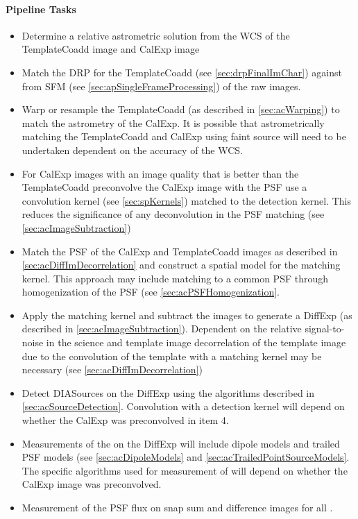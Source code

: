\paragraph{Pipeline Tasks}
\begin{itemize}
\item Determine a relative astrometric solution from the WCS of the TemplateCoadd image and CalExp image
\item Match the DRP \Sources for the TemplateCoadd (see \ref{sec:drpFinalImChar}) against \Sources from SFM (see \ref{sec:apSingleFrameProcessing}) of the raw images.
\item Warp or resample the TemplateCoadd (as described in \ref{sec:acWarping}) to match the astrometry of the CalExp. It is possible that astrometrically matching the TemplateCoadd and CalExp using faint source will need to be undertaken dependent on the accuracy of the WCS.
\item For CalExp images with an image quality that is better than the TemplateCoadd preconvolve the CalExp image with the PSF use a  convolution kernel (see \ref{sec:spKernels}) matched to the detection kernel. This reduces the significance of any deconvolution in the PSF matching (see \ref{sec:acImageSubtraction})
\item Match the PSF of the CalExp and TemplateCoadd images as described in \ref{sec:acDiffImDecorrelation} and construct a spatial model for the matching kernel. This approach may include matching to a common PSF through homogenization of the PSF (see \ref{sec:acPSFHomogenization}.
\item Apply the matching kernel and subtract the images to generate a DiffExp (as described in \ref{sec:acImageSubtraction}). Dependent on the relative signal-to-noise in the science and template image decorrelation of the template image due to the convolution of the template with a matching kernel may be necessary (see \ref{sec:acDiffImDecorrelation})
\item Detect DIASources on the DiffExp using the algorithms described in \ref{sec:acSourceDetection}. Convolution with a detection kernel will depend on whether the CalExp was preconvolved in item 4. 
\item Measurements of the \DIASources on the DiffExp will include dipole models and trailed PSF models (see  \ref{sec:acDipoleModels} and \ref{sec:acTrailedPointSourceModels}. The specific algorithms used for measurement of \DIASources will depend on whether the CalExp image was preconvolved.  
\item Measurement of the PSF flux on snap sum and difference images for all \DIASources.

\end{itemize}
